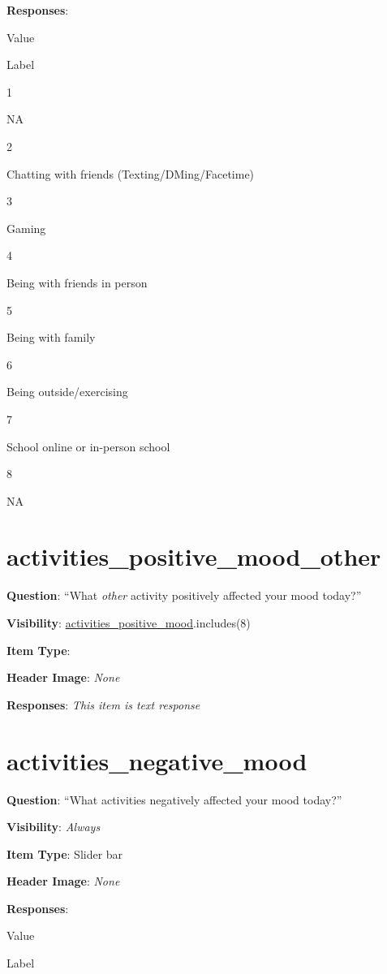 \documentclass[]{book}
\begin{document}
\textbf{Responses}:

Value

Label

1

NA

2

Chatting with friends (Texting/DMing/Facetime)

3

Gaming

4

Being with friends in person

5

Being with family

6

Being outside/exercising

7

School online or in-person school

8

NA

\hypertarget{activities_positive_mood_other}{%
\section{activities\_positive\_mood\_other}\label{activities_positive_mood_other}}

\textbf{Question}: ``What \emph{other} activity positively affected your mood today?''

\textbf{Visibility}: \protect\hyperlink{activities_positive_mood}{activities\_positive\_mood}.includes(8)

\textbf{Item Type}:

\textbf{Header Image}: \emph{None}

\textbf{Responses}: \emph{This item is text response}

\hypertarget{activities_negative_mood}{%
\section{activities\_negative\_mood}\label{activities_negative_mood}}

\textbf{Question}: ``What activities negatively affected your mood today?''

\textbf{Visibility}: \emph{Always}

\textbf{Item Type}: Slider bar

\textbf{Header Image}: \emph{None}

\textbf{Responses}:

Value

Label
\end{document}
